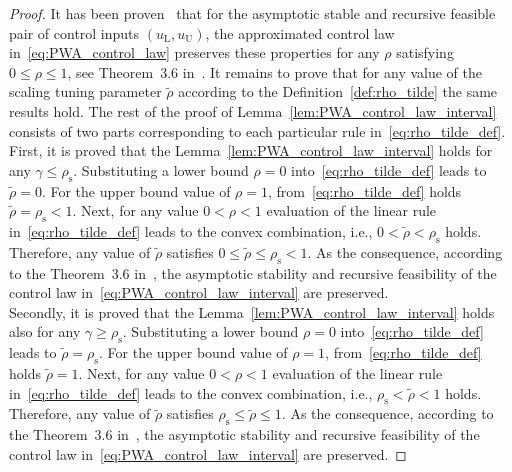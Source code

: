 \documentclass[preprint,12pt]{elsarticle}
\begin{document}
	\begin{proof}
		\label{proof:rho_tilde}
		It has been proven~\cite{Oravec_tunable} that for the asymptotic stable and recursive feasible pair of control inputs $(u_{\mathrm{L}}, u_{\mathrm{U}})$, the approximated control law in~\eqref{eq:PWA_control_law} preserves these properties for any $\rho$ satisfying $0 \leq \rho \leq 1$, see Theorem~3.6 in~\cite{Oravec_tunable}. 
		It remains to prove that for any value of the scaling tuning parameter $\widetilde{\rho}$ according to the Definition~\ref{def:rho_tilde} the same results hold. 
		The rest of the proof of Lemma~\ref{lem:PWA_control_law_interval} consists of two parts corresponding to each particular rule in~\eqref{eq:rho_tilde_def}. 
		\\
		First, it is proved that the Lemma~\ref{lem:PWA_control_law_interval} holds for any $\gamma \leq \rho_{\mathrm{s}}$. Substituting a lower bound $\rho=0$ into~\eqref{eq:rho_tilde_def} leads to
		$\widetilde{\rho} = 0$. 
		For the upper bound value of $\rho=1$, from~\eqref{eq:rho_tilde_def} holds $\widetilde{\rho} = \rho_{\mathrm{s}} < 1$. Next, for any value $0 < \rho < 1$ evaluation of the linear rule in~\eqref{eq:rho_tilde_def} leads to the convex combination, i.e., $0 < \widetilde{\rho} < \rho_{\mathrm{s}} $ holds. 
		Therefore, any value of $\widetilde{\rho}$ satisfies $0 \leq \widetilde{\rho} \leq \rho_{\mathrm{s}} < 1$. As the consequence, according to the Theorem~3.6 in~\cite{Oravec_tunable}, the asymptotic stability and recursive feasibility of the control law in~\eqref{eq:PWA_control_law_interval} are preserved. 
		\\
		Secondly, it is proved that the Lemma~\ref{lem:PWA_control_law_interval} holds also for any $\gamma \geq \rho_{\mathrm{s}}$. Substituting a lower bound $\rho=0$ into~\eqref{eq:rho_tilde_def} leads to
		$\widetilde{\rho} = \rho_{\mathrm{s}}$. 
		For the upper bound value of $\rho=1$, from~\eqref{eq:rho_tilde_def} holds $\widetilde{\rho} = 1$. Next, for any value $0 < \rho < 1$ evaluation of the linear rule in~\eqref{eq:rho_tilde_def} leads to the convex combination, i.e., $\rho_{\mathrm{s}} < \widetilde{\rho} < 1 $ holds. 
		Therefore, any value of $\widetilde{\rho}$ satisfies $\rho_{\mathrm{s}} \leq \widetilde{\rho} \leq 1$. As the consequence, according to the Theorem~3.6 in~\cite{Oravec_tunable}, the asymptotic stability and recursive feasibility of the control law in~\eqref{eq:PWA_control_law_interval} are preserved. 
	\end{proof}
	
\end{document}

